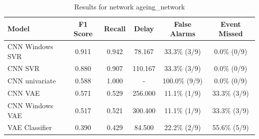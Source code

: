 \begin{table}
\caption{Results for network ageing_network}
\label{tab:results-ageing_network}
\begin{tabular}{lccccc}
\toprule
Model & F1 Score & Recall & Delay & False Alarms & Event Missed \\
\midrule
CNN Windows SVR & 0.911 & 0.942 & 78.167 & 33.3\% (3/9) & 0.0\% (0/9) \\
CNN SVR & 0.880 & 0.907 & 110.167 & 33.3\% (3/9) & 0.0\% (0/9) \\
CNN univariate & 0.588 & 1.000 & - & 100.0\% (9/9) & 0.0\% (0/9) \\
CNN VAE & 0.571 & 0.529 & 256.000 & 11.1\% (1/9) & 33.3\% (3/9) \\
CNN Windows VAE & 0.517 & 0.521 & 300.400 & 11.1\% (1/9) & 33.3\% (3/9) \\
VAE Classifier & 0.390 & 0.429 & 84.500 & 22.2\% (2/9) & 55.6\% (5/9) \\
\bottomrule
\end{tabular}
\end{table}
